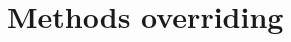 \documentclass{KodeBook}
\begin{document}
\section{Methods overriding}



%
%
%
%
%
%
%
%
%
%
%
%
%
%
%
%
%
%
%
%
%
%
%
%
%
%
%
%
%
%
%
%
%
\end{document}
